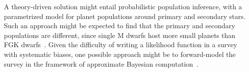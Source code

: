 \documentclass[12pt,modern]{aastex61}
\begin{document}
A theory-driven solution might entail probabilistic population
inference, with a parametrized model for planet populations around
primary and secondary stars.  Such an approach might be expected to
find that the primary and secondary populations are different, since
single M dwarfs host more small planets than FGK
dwarfs~\citep{dressing_occurrence_2015}.  Given the difficulty of
writing a likelihood function in a survey with systematic
biases, one possible approach might be to forward-model the survey in
the framework of approximate Bayesian
computation~\citep[\textit{e.g.},][]{morehead_understanding_2016}.

\end{document}
